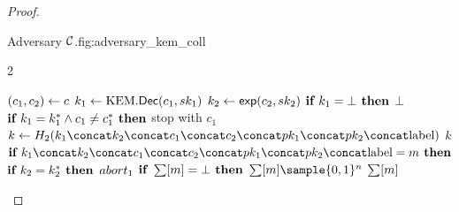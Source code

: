 \begin{proof}
\begin{itemize}
\begin{gamefigure}{Adversary $\mathcal{C}$.}{fig:adversary_kem_coll}
\begin{games}{2}
\begin{gameenv}{\oracledec}
                                                                                    \State $(c_1, c_2) \leftarrow c$
                                                                                    \State $k_1 \leftarrow \text{KEM}.\textsf{Dec}(c_1, sk_1)$
                                                                                    \State $k_2 \leftarrow \textsf{exp}(c_2, sk_2)$
                                                                                    \State $\textbf{if } k_1 = \bot \textbf{ then}$
                                                                                        \State \quad \Return $\bot$
                                                                                        \State $\textbf{if } k_1 = k^*_1 \wedge c_1 \neq c^*_1 \textbf{ then}$
                                                                                            \State \quad stop with $c_1$
                                                                                            \State $k \assign H_2(\hashinput)$
                                                                                            \State \Return $k$
                                                                                            \Statex
                                                                                            \State \underline{}
                                                                                            \State $\ifthen{\hashinput = m}$
                                                                                                \State \quad $\textbf{if } k_2 = k^*_2 \textbf{ then}$
                                                                                                    \State \qquad $abort_1$
                                                                                                    \State $\textbf{if } \sum[m] = \bot \textbf{ then}$
                                                                                                        \State \quad $\ROMtable[m] \sample \bits^{n}$
                                                                                                        \State \Return $\sum[m]$
                                                                                                    \end{gameenv}
                                                                                                \end{games}
                                                                                            \end{gamefigure}


\end{itemize}
\end{proof}
